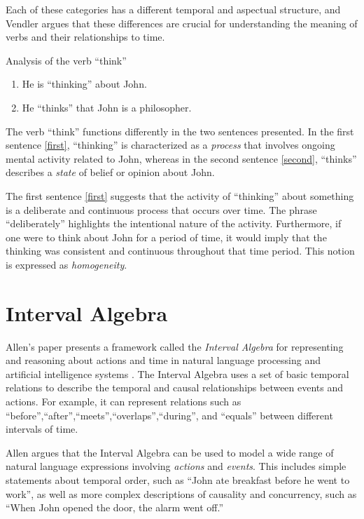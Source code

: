 Each of these categories has a different temporal and aspectual structure, and Vendler argues that these differences are crucial for understanding the meaning of verbs and their relationships to time.



\begin{exmp} Analysis of the verb ``think''
	\begin{enumerate}
		\item He is ``thinking'' about John. \label{first}
		\item He ``thinks'' that John is a philosopher. \label{second}
	\end{enumerate}

	The verb ``think'' functions differently in the two sentences presented. In the first sentence \ref{first}, ``thinking'' is characterized as a \textit{process} that involves ongoing mental activity related to John, whereas in the second sentence \ref{second}, ``thinks'' describes a \textit{state} of belief or opinion about John.

	The first sentence \ref{first} suggests that the activity of ``thinking'' about something is a deliberate and continuous process that occurs over time. The phrase ``deliberately'' highlights the intentional nature of the activity. Furthermore, if one were to think about John for a period of time, it would imply that the thinking was consistent and continuous throughout that time period. This notion is expressed as \textit{homogeneity}.
\end{exmp}


\section{Interval Algebra}

Allen's paper presents a framework called the \textit{Interval Algebra} for representing and reasoning about actions and time in natural language processing and artificial intelligence systems \cite{allen1984towards}. The Interval Algebra uses a set of basic temporal relations to describe the temporal and causal relationships between events and actions. For example, it can represent relations such as ``before'',``after'',``meets'',``overlaps'',``during'', and ``equals'' between different intervals of time.

Allen argues that the Interval Algebra can be used to model a wide range of natural language expressions involving \textit{actions} and \textit{events}. This includes simple statements about temporal order, such as ``John ate breakfast before he went to work'', as well as more complex descriptions of causality and concurrency, such as ``When John opened the door, the alarm went off.''

